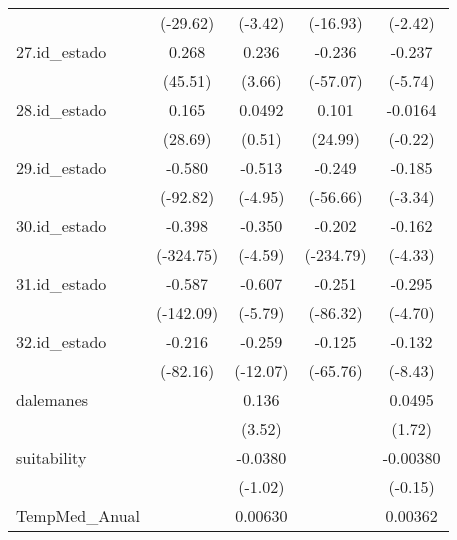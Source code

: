 {\begin{tabular}{l*{4}{c}}
            &    (-29.62)         &     (-3.42)         &    (-16.93)         &     (-2.42)         \\
[1em]
27.id\_estado&       0.268\sym{***}&       0.236\sym{**} &      -0.236\sym{***}&      -0.237\sym{***}\\
            &     (45.51)         &      (3.66)         &    (-57.07)         &     (-5.74)         \\
[1em]
28.id\_estado&       0.165\sym{***}&      0.0492         &       0.101\sym{***}&     -0.0164         \\
            &     (28.69)         &      (0.51)         &     (24.99)         &     (-0.22)         \\
[1em]
29.id\_estado&      -0.580\sym{***}&      -0.513\sym{***}&      -0.249\sym{***}&      -0.185\sym{**} \\
            &    (-92.82)         &     (-4.95)         &    (-56.66)         &     (-3.34)         \\
[1em]
30.id\_estado&      -0.398\sym{***}&      -0.350\sym{***}&      -0.202\sym{***}&      -0.162\sym{***}\\
            &   (-324.75)         &     (-4.59)         &   (-234.79)         &     (-4.33)         \\
[1em]
31.id\_estado&      -0.587\sym{***}&      -0.607\sym{***}&      -0.251\sym{***}&      -0.295\sym{***}\\
            &   (-142.09)         &     (-5.79)         &    (-86.32)         &     (-4.70)         \\
[1em]
32.id\_estado&      -0.216\sym{***}&      -0.259\sym{***}&      -0.125\sym{***}&      -0.132\sym{***}\\
            &    (-82.16)         &    (-12.07)         &    (-65.76)         &     (-8.43)         \\
[1em]
dalemanes   &                     &       0.136\sym{**} &                     &      0.0495         \\
            &                     &      (3.52)         &                     &      (1.72)         \\
[1em]
suitability &                     &     -0.0380         &                     &    -0.00380         \\
            &                     &     (-1.02)         &                     &     (-0.15)         \\
[1em]
TempMed\_Anual&                     &     0.00630         &                     &     0.00362         \\

\end{tabular}}
